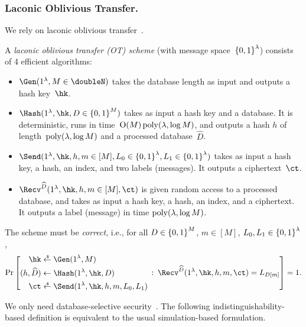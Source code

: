 \subsubsection{Laconic Oblivious Transfer.}
We rely on laconic oblivious transfer~\cite{C:CDGGMP17}.

\begin{definition}\label{def:lot}
A \emph{laconic oblivious transfer (OT) scheme} (with message space~${\{0,1\}}^\lambda$) consists of 4 efficient algorithms:
\begin{itemize}
\item $\Gen(1^\lambda,{M\in\doubleN})$ takes the database length as input and outputs a hash key~$\hk$.
\item $\Hash(1^\lambda,\hk,{D\in\bit^M})$ takes as input a hash key and a database.
It is deterministic,
runs in time~$\operatorname{O}(M)\operatorname{poly}(\lambda,\log M)$, and
outputs a hash $h$ of length~$\operatorname{poly}(\lambda,\log M)$ and a processed database~$\widehat{D}$.
\item $\Send(1^\lambda,\hk,h,{m\in[M]},{L_0\in\bit^\lambda},{L_1\in\bit^\lambda})$
takes as input a hash key, a hash, an index, and two labels (messages).
It outputs a ciphertext~$\ct$.
\item $\Recv^{\widehat{D}}(1^\lambda,\hk,h,{m\in[M]},\ct)$
is given random access to a processed database, and
takes as input a hash key, a hash, an index, and a ciphertext.
It outputs a label (message) in time $\operatorname{poly}(\lambda,\log M)$.
\end{itemize}
The scheme must be \emph{correct}, i.e., for all
${D\in{\{0,1\}}^M}$,
${m\in[M]}$,
${L_0,L_1\in{\{0,1\}}^\lambda}$,
\begin{align*}
\Pr\left[
\begin{aligned}
\hk&{}\draws\Gen(1^\lambda,M)\\
(h,\widehat{D})&{}\gets\Hash(1^\lambda,\hk,D)\\
\ct&{}\draws\Send(1^\lambda,\hk,h,m,L_0,L_1)
\end{aligned}
\::\:
\Recv^{\widehat{D}}(1^\lambda,\hk,h,m,\ct)=L_{D[m]}
\right]=1.
\end{align*}
\end{definition}

\noindent
We only need database-selective security~\cite{TCC:AnaLom18}.
The following indistinguishability-based definition is equivalent to the usual simulation-based formulation.


